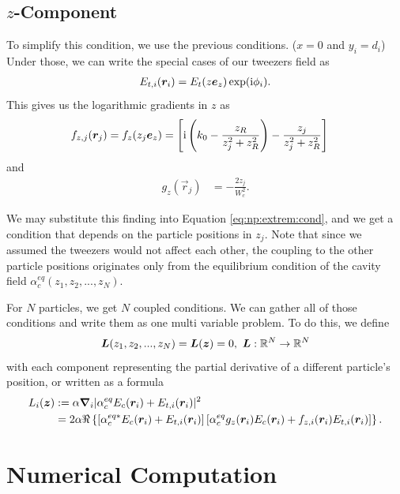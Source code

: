 \subsection{\texorpdfstring{$z$}{z}-Component}
\label{ssec:np:extrem:z}
To simplify this condition, 
    we use the previous conditions.
    ($x = 0$ and $y_i = d_i$)
Under those, we can write the special cases of our tweezers field as
\begin{align}
    E_{t,i}(\bm{r}_i) = E_t(z \bm{e}_z) \exp(\mathrm{i}\phi_i).
\end{align}
This gives us the logarithmic gradients in $z$ as
\begin{align}
    f_{z,j}(\bm{r}_j) 
        & = f_{z}(z_j \bm{e}_z) 
        = \left[ 
            \mathrm{i}\left( k_0-\frac{z_R}{z_j^2 + z_R^2} \right) - \frac{z_j}{z_j^2 + z_R^2} 
        \right]
\end{align}
and
\begin{align}
    g_z(\vec r_j) &= -\frac{2z_j}{W_c^2}.
\end{align}

We may substitute this finding into Equation \eqref{eq:np:extrem:cond}, 
    and we get a condition that depends on the particle positions in $z_j$.
Note that since we assumed the tweezers would not affect each other,
    the coupling to the other particle positions originates only from the equilibrium condition of the cavity field $\alpha_{c}^{eq}(z_1,z_2,...,z_N)$.

For $N$ particles, we get $N$ coupled conditions.
We can gather all of those conditions
    and write them as one multi variable problem.
To do this, we define
    \begin{equation}
        \bm{L}(z_1,z_2,..., z_N) = \bm{L}(\bm{z}) = 0,~\bm{L}: \mathbb{R}^N \rightarrow \mathbb{R}^N
    \end{equation}
with each component representing the partial derivative of a different particle's position,
    or written as a formula
\begin{align}
    L_i(\bm{z}) &:= \alpha \bm{\nabla}_i|\alpha_c^{eq} E_c(\bm{r}_i) + E_{t,i}(\bm{r}_i)|^2 \\
    & =  2\alpha\Re\left\{ 
        \left[ \alpha_c^{eq*} E_c(\bm{r}_i) + E_{t,i}(\bm{r}_i) \right]
        \left[ \alpha_c^{eq} g_z(\bm{r}_i)E_c(\bm{r}_i) + f_{z,i}(\bm{r}_i) E_{t,i}(\bm{r}_i) \right] 
    \right\}.
\end{align}

\section{Numerical Computation}

